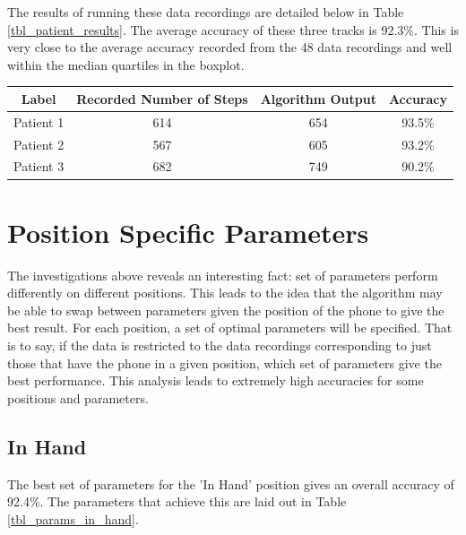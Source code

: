             The results of running these data recordings are detailed below in Table \ref{tbl_patient_results}. The average accuracy of these three tracks is 92.3\%. This is very close to the average accuracy recorded from the 48 data recordings and well within the median quartiles in the boxplot.

            \begin{center}
                \label{tbl_patient_results}
                \begin{tabular}{|c|c|c|c|}
                    \hline
                    Label & Recorded Number of Steps & Algorithm Output & Accuracy \\
                    \hline
                    Patient 1 & 614 & 654 & 93.5\% \\ 
                    Patient 2 & 567 & 605 & 93.2\% \\
                    Patient 3 & 682 & 749 & 90.2\% \\
                    \hline
                \end{tabular}
            \end{center}

        \section{Position Specific Parameters}

            The investigations above reveals an interesting fact: set of parameters perform differently on different positions. This leads to the idea that the algorithm may be able to swap between parameters given the position of the phone to give the best result. For each position, a set of optimal parameters will be specified. That is to say, if the data is restricted to the data recordings corresponding to just those that have the phone in a given position, which set of parameters give the best performance. This analysis leads to extremely high accuracies for some positions and parameters.

            \subsection{In Hand}

                The best set of parameters for the 'In Hand' position gives an overall accuracy of 92.4\%. The parameters that achieve this are laid out in Table \ref{tbl_params_in_hand}.

